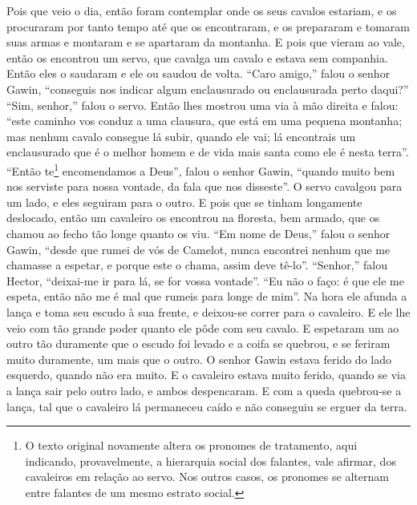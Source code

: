 Pois que veio o dia, então foram contemplar onde os seus cavalos estariam, e os
procuraram por tanto tempo até que os encontraram, e os prepararam e tomaram
suas armas e montaram e se apartaram da montanha. E pois que vieram ao vale,
então os encontrou um servo, que cavalga um cavalo e estava sem companhia.
Então eles o saudaram e ele ou saudou de volta. “Caro amigo,” falou o senhor
Gawin, “conseguis nos indicar algum enclausurado ou enclausurada perto daqui?”
“Sim, senhor,” falou o servo. Então lhes mostrou uma via à mão direita e falou:
``este caminho vos conduz a uma clausura, que está em uma pequena montanha; mas
nenhum cavalo consegue lá subir, quando ele vai; lá encontrais um enclausurado
que é o melhor homem e de vida mais santa como ele é nesta terra”. “Então
te\footnote{ O texto original  novamente altera os pronomes de tratamento, aqui
indicando, provavelmente, a hierarquia social dos falantes, vale afirmar, dos
cavaleiros em relação ao servo. Nos outros casos, os pronomes se alternam entre
falantes de um mesmo estrato social.}  encomendamos a Deus”, falou o
senhor Gawin, “quando muito bem nos serviste para nossa vontade, da fala que
nos disseste”.  O servo cavalgou para um lado, e eles seguiram para o
outro. E pois que se tinham longamente deslocado, então um cavaleiro os
encontrou na floresta, bem armado, que os chamou ao fecho tão longe quanto os
viu. “Em nome de Deus,” falou o senhor Gawin, “desde que rumei de vós de
Camelot, nunca encontrei nenhum que me chamasse a espetar, e porque este o
chama, assim deve tê-lo”. “Senhor,” falou Hector, “deixai-me ir para lá, se for
vossa vontade”. “Eu não o faço: é que ele me espeta, então não me é mal que
rumeis para longe de mim”. Na hora ele afunda a lança e toma seu escudo à sua
frente, e deixou-se correr para o cavaleiro. E ele lhe veio com tão grande
poder quanto ele pôde com seu cavalo. E espetaram um ao outro  tão duramente
que o escudo foi levado e a coifa se quebrou, e se feriram muito duramente, um
mais que o outro. O senhor Gawin estava ferido do lado esquerdo, quando não era
muito. E o cavaleiro estava muito ferido, quando se via a lança sair pelo outro
lado, e ambos despencaram. E com a queda quebrou-se a lança, tal que o
cavaleiro lá permaneceu caído e não conseguiu se erguer da terra. 

